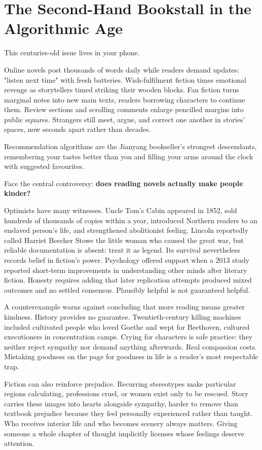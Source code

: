 \section[The Bookstall in the Algorithmic Age]{The Second-Hand Bookstall in the Algorithmic Age}
This centuries-old issue lives in your phone.

Online novels post thousands of words daily while readers demand updates: "listen next time" with fresh batteries. Wish-fulfilment fiction times emotional revenge as storytellers timed striking their wooden blocks. Fan fiction turns marginal notes into new main texts, readers borrowing characters to continue them. Review sections and scrolling comments enlarge pencilled margins into public squares. Strangers still meet, argue, and correct one another in stories' spaces, now seconds apart rather than decades.

Recommendation algorithms are the Jianyang bookseller's strongest descendants, remembering your tastes better than you and filling your arms around the clock with suggested favourites.

Face the central controversy: \textbf{does reading novels actually make people kinder?}

Optimists have many witnesses. Uncle Tom's Cabin appeared in 1852, sold hundreds of thousands of copies within a year, introduced Northern readers to an enslaved person's life, and strengthened abolitionist feeling. Lincoln reportedly called Harriet Beecher Stowe the little woman who caused the great war, but reliable documentation is absent: treat it as legend. Its survival nevertheless records belief in fiction's power. Psychology offered support when a 2013 study reported short-term improvements in understanding other minds after literary fiction. Honesty requires adding that later replication attempts produced mixed outcomes and no settled consensus. Plausibly helpful is not guaranteed helpful.

A counterexample warns against concluding that more reading means greater kindness. History provides no guarantee. Twentieth-century killing machines included cultivated people who loved Goethe and wept for Beethoven, cultured executioners in concentration camps. Crying for characters is safe practice: they neither reject sympathy nor demand anything afterwards. Real compassion costs. Mistaking goodness on the page for goodness in life is a reader's most respectable trap.

Fiction can also reinforce prejudice. Recurring stereotypes make particular regions calculating, professions cruel, or women exist only to be rescued. Story carries these images into hearts alongside sympathy, harder to remove than textbook prejudice because they feel personally experienced rather than taught. Who receives interior life and who becomes scenery always matters. Giving someone a whole chapter of thought implicitly licenses whose feelings deserve attention.

